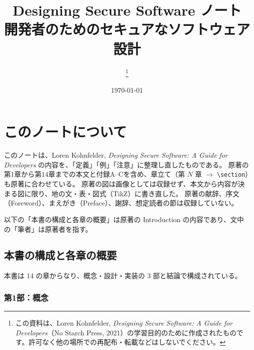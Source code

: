 \documentclass[uplatex]{jsarticle}
\title{Designing Secure Software ノート\\[0.5em]\large 開発者のためのセキュアなソフトウェア設計}
\author{\thanks{この資料は、Loren Kohnfelder, \textit{Designing Secure Software: A Guide for Developers}（No Starch Press, 2021）の学習目的のために作成されたものです。許可なく他の場所での再配布・転載などはしないでください。}}
\date{\today}
\begin{document}
\maketitle
\tableofcontents
\newpage

\section*{このノートについて}

このノートは、Loren Kohnfelder, \textit{Designing Secure Software: A Guide for Developers} \cite{Kohnfelder2021} の内容を、「定義」「例」「注意」に整理し直したものである。
原著の第1章から第14章までの本文と付録A--Cを含め、章立て（第 $N$ 章 $\to$ \verb|\section|）も原著に合わせている。
原著の図は画像としては収録せず、本文から内容が決まる図に限り、地の文・表・図式（TikZ）に書き直した。
原著の献辞、序文（Foreword）、まえがき（Preface）、謝辞、想定読者の節は収録していない。

以下の「本書の構成と各章の概要」は原著の Introduction の内容であり、文中の「筆者」は原著者を指す。

\subsection*{本書の構成と各章の概要}

本書は 14 の章からなり、概念・設計・実装の 3 部と結論で構成されている。

\subsubsection*{第1部：概念}
\end{document}
